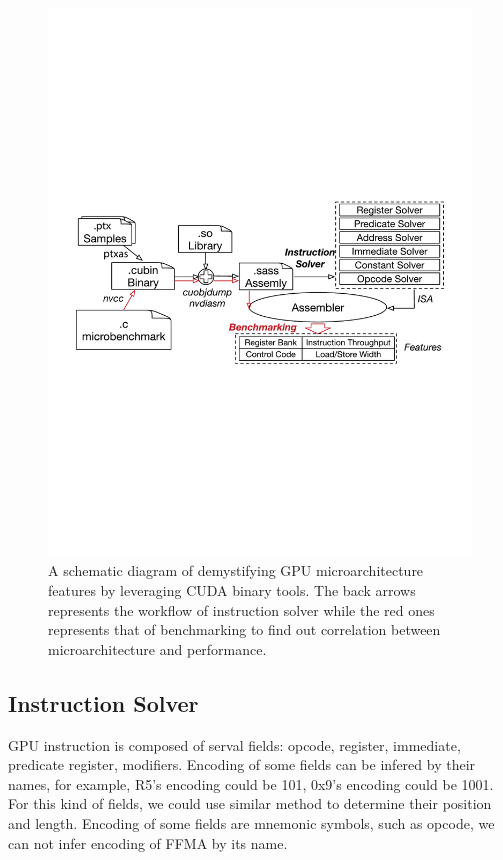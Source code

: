 \documentclass{sig-alternate-05-2015}
\begin{document}
\begin{figure}[htbp]
\begin{center}
\includegraphics[scale=0.45]{methodology}
\caption{A schematic diagram of demystifying GPU microarchitecture features by leveraging CUDA binary tools. The back arrows represents the workflow of instruction solver while the red ones represents that of benchmarking to find out correlation between microarchitecture and performance.}
\label{fig:workflow}
\end{center}
\end{figure}

\subsection{Instruction Solver}
GPU instruction is composed of  serval fields: opcode, register, immediate, predicate register, modifiers. Encoding of some fields can be infered by their names, for example, R5's encoding could be 101, 0x9's encoding could be 1001. For this kind of fields, we could use similar method to determine their position and length. Encoding of some fields are mnemonic symbols, such as opcode, we can not infer encoding of FFMA by its name.
\end{document}
